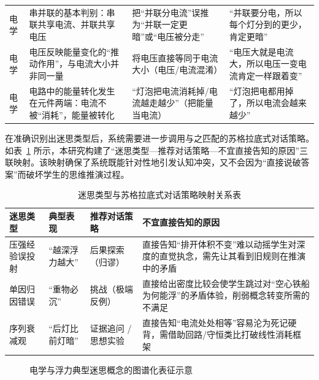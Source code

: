 \begin{table}[htbp]
\begin{tabular}{p{1.2cm}p{3.7cm}p{4.0cm}p{4.8cm}}
        电学 & 串并联的基本判别：串联共享电流、并联共享电压 & 把“并联分电流”误推为“并联一定更暗”或“电压被分走”\cite{kucukozer2007misconceptions} & “并联要分电，所以每个灯分到的更少，肯定更暗” \\
        电学 & 电压反映能量变化的“推动作用”，与电流大小并非同一量 & 将电压直接等同于电流大小（电压/电流混淆）\cite{kucukozer2007misconceptions} & “电压大就是电流大，所以电压一变电流肯定一样跟着变” \\
        电学 & 电路中的能量转化发生在元件两端：电流不被“消耗”，能量被转化 & “灯泡把电流消耗掉/电流越走越少”（把能量当电流）\cite{shipstone1984study} & “灯泡把电都用掉了，所以电流会越来越少” \\
        \hline
    \end{tabular}
\end{table}

在准确识别出迷思类型后，系统需要进一步调用与之匹配的苏格拉底式对话策略。如表~\ref{tab:strategy-mapping} 所示，本研究构建了“迷思类型—推荐对话策略—不宜直接告知的原因”三联映射。该映射确保了系统既能针对性地引发认知冲突，又不会因为“直接说破答案”而破坏学生的思维推演过程。

\begin{table}[htbp]
    \centering
    \caption{迷思类型与苏格拉底式对话策略映射关系表}
    \label{tab:strategy-mapping}
    \begin{tabular}{p{2.2cm}p{2.8cm}p{3.2cm}p{5.5cm}}
        \hline
        \textbf{迷思类型} & \textbf{典型表现} & \textbf{推荐对话策略} & \textbf{不宜直接告知的原因} \\
        \hline
        压强经验误投射 & “越深浮力越大” & 后果探索（归谬） & 直接告知“排开体积不变”难以动摇学生对深度的直觉执念，需先让其看到旧规则在推演中的矛盾 \\
        单因归因错误 & “重物必沉” & 挑战（极端反例） & 直接给出密度比较会使学生跳过对“空心铁船为何能浮”的矛盾体验，削弱概念转变所需的不满足 \\
        序列衰减观 & “后灯比前灯暗” & 证据追问 / 思想实验 & 直接告知“电流处处相等”容易沦为死记硬背，需借助回路/守恒类比打破线性消耗框架 \\
        \hline
    \end{tabular}
\end{table}

\begin{figure}[htbp]
    \centering
    \caption{电学与浮力典型迷思概念的图谱化表征示意}
    \label{fig:misconception-graph}
\end{figure}


